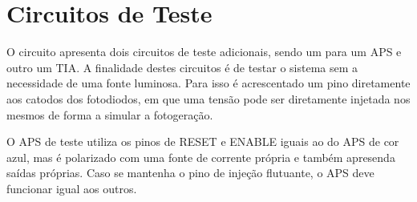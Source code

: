 \section{Circuitos de Teste}
\label{BlocoTestes}

O circuito apresenta dois circuitos de teste adicionais, sendo um para um APS e outro um TIA. A finalidade destes circuitos \'e de testar o sistema sem a necessidade de uma fonte luminosa. Para isso \'e acrescentado um pino diretamente aos catodos dos fotodiodos, em que uma tens\~ao pode ser diretamente injetada nos mesmos de forma a simular a fotogera{\c c}\~ao.

O APS de teste utiliza os pinos de RESET e ENABLE iguais ao do APS de cor azul, mas \'e polarizado com uma fonte de corrente pr\'opria e também apresenda sa\'idas pr\'oprias. Caso se mantenha o pino de inje{\c c}\~ao flutuante, o APS deve funcionar igual aos outros.